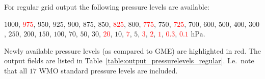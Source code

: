 \renewcommand{\pressurelevelsTriangular}{$1000$, $950$, $850$, $700$, $500$, $300$ $\mathrm{hPa}$}

\renewcommand{\new}[1]{\textcolor{red}{#1}}
\renewcommand{\pressurelevelsRegular}{$1000$, \new{$975$}, $950$, $925$, $900$, 
                                    $875$, $850$, \new{$825$}, $800$, 
                                    \new{$775$}, $750$, \new{$725$}, $700$, $600$, 
                                    $500$, $400$, $300$, $250$, $200$, $150$, $100$, 
                                    $70$, $50$, $30$, \new{$20$}, $10$, 
                                    \new{$7$}, $5$, \new{$3$}, 
                                    \new{$2$}, \new{$1$}, 
                                     \new{$0.3$}, \new{$0.1$} $\mathrm{hPa}$}

For regular grid output the following pressure levels are available: 
\begin{center}
\begin{minipage}{0.5\linewidth}
\pressurelevelsRegular. 
\end{minipage}
\end{center}


Newly available pressure levels (as compared to GME) are highlighted in red. 
The output fields are listed in Table~\ref{table:output_pressurelevels_regular}.
I.e.\ note that all $17$ WMO standard pressure levels are included.

\renewcommand{\new}[1]{#1}


